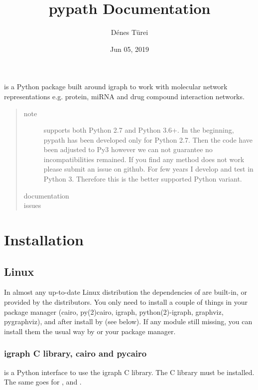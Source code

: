 \documentclass[letterpaper,10pt,english]{sphinxmanual}
\title{pypath Documentation}
\date{Jun 05, 2019}
\author{Dénes Türei}
\begin{document}
\pagestyle{empty}
\sphinxmaketitle
\pagestyle{plain}
\sphinxtableofcontents
\pagestyle{normal}
\label{\detokenize{index::doc}}


 is a Python package built around igraph to work with molecular
network representations e.g. protein, miRNA and drug compound interaction
networks.
\begin{quote}\begin{description}
\item[{note}] \leavevmode
{} supports both Python 2.7 and Python 3.6+. In the beginning,
pypath has been developed only for Python 2.7. Then the code have been
adjusted to Py3 however we can not guarantee no incompatibilities
remained. If you find any method does not work please submit an issue on
github. For few years I develop and test  in Python 3. Therefore
this is the better supported Python variant.

\item[{documentation}] \leavevmode
{}

\item[{issues}] \leavevmode
{}

\end{description}\end{quote}


\chapter{Installation}
\label{\detokenize{installation:installation}}\label{\detokenize{installation::doc}}

\section{Linux}
\label{\detokenize{installation:linux}}
In almost any up-to-date Linux distribution the dependencies of  are
built-in, or provided by the distributors. You only need to install a couple
of things in your package manager (cairo, py(2)cairo, igraph,
python(2)-igraph, graphviz, pygraphviz), and after install  by 
(see below). If any module still missing, you can install them the usual way
by  or your package manager.


\subsection{igraph C library, cairo and pycairo}
\label{\detokenize{installation:igraph-c-library-cairo-and-pycairo}}
 is a Python interface to use the igraph C library. The
C library must be installed. The same goes for ,  and
.
\end{document}
